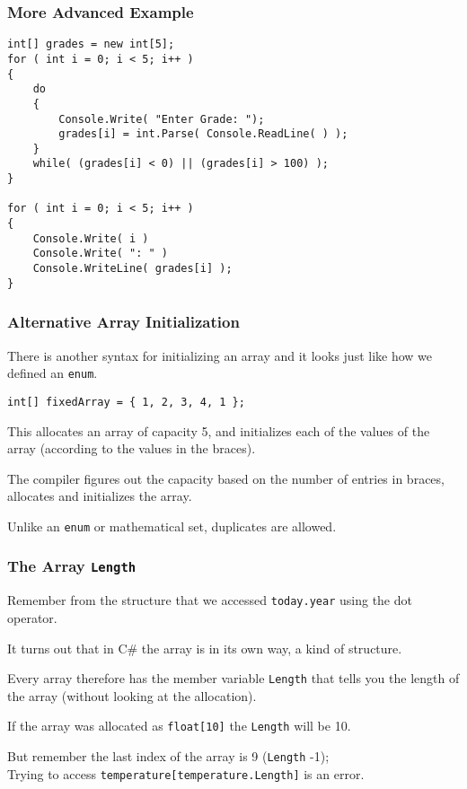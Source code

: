 \begin{frame}[fragile]
\frametitle{More Advanced Example}

{\small
\begin{verbatim}
int[] grades = new int[5];
for ( int i = 0; i < 5; i++ )
{
    do
    {
        Console.Write( "Enter Grade: ");
        grades[i] = int.Parse( Console.ReadLine( ) );
    }
    while( (grades[i] < 0) || (grades[i] > 100) );
}

for ( int i = 0; i < 5; i++ )
{
    Console.Write( i )
    Console.Write( ": " )
    Console.WriteLine( grades[i] );
}
\end{verbatim}
}
\end{frame}

\begin{frame}
\frametitle{Alternative Array Initialization}

There is another syntax for initializing an array and it looks just like how we defined an \texttt{enum}.

\texttt{int[] fixedArray = \{ 1, 2, 3, 4, 1 \};}

This allocates an array of capacity 5, and initializes each of the values of the array (according to the values in the braces).

The compiler figures out the capacity based on the number of entries in braces, allocates and initializes the array.

Unlike an \texttt{enum} or mathematical set, duplicates are allowed.

\end{frame}

\begin{frame}
\frametitle{The Array \texttt{Length}}
Remember from the structure that we accessed \texttt{today.year} using the dot operator.

It turns out that in C\# the array is in its own way, a kind of structure.

Every array therefore has the member variable \texttt{Length} that tells you the length of the array (without looking at the allocation).

If the array was allocated as \texttt{float[10]} the \texttt{Length} will be 10.

But remember the last index of the array is 9 (\texttt{Length} -1);\\
\quad Trying to access \texttt{temperature[temperature.Length]} is an error.

\end{frame}


